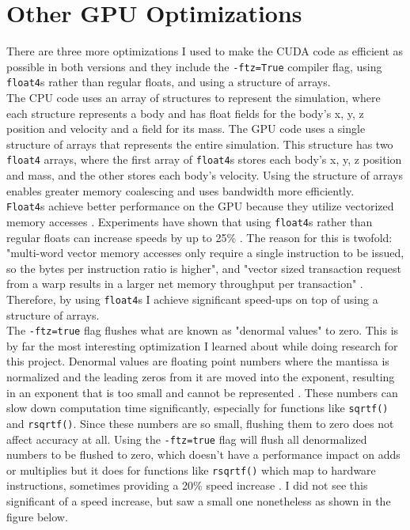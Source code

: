 \section{Other GPU Optimizations}
\indent There are three more optimizations I used to make the CUDA code as efficient as possible in both versions and they include the \verb|-ftz=True| compiler flag, using \verb|float4|s rather than regular floats, and using a structure of arrays. \\
\indent The CPU code uses an array of structures to represent the simulation, where each structure represents a body and has float fields for the body's x, y, z position and velocity and a field for its mass. The GPU code uses a single structure of arrays that represents the entire simulation. This structure has two \verb|float4| arrays, where the first array of \verb|float4|s stores each body's x, y, z position and mass, and the other stores each body's velocity. Using the structure of arrays enables greater memory coalescing and uses bandwidth more efficiently.\\
\indent \verb|Float4|s achieve better performance on the GPU because they utilize vectorized memory accesses \cite{Luitjens_2013}. Experiments have shown that using \verb|float4|s rather than regular floats can increase speeds by up to 25\% \cite{Vitality_2014}. The reason for this is twofold: "multi-word vector memory accesses only require a single instruction to be issued, so the bytes per instruction ratio is higher", and "vector sized transaction request from a warp results in a larger net memory throughput per transaction" \cite{talonmies_2015}. Therefore, by using \verb|float4|s I achieve significant speed-ups on top of using a structure of arrays.\\
\indent The \verb|-ftz=true| flag flushes what are known as "denormal values" to zero. This is by far the most interesting optimization I learned about while doing research for this project. Denormal values are floating point numbers where the mantissa is normalized and the leading zeros from it are moved into the exponent, resulting in an exponent that is too small and cannot be represented \cite{Harris_2013}. These numbers can slow down computation time significantly, especially for functions like \verb|sqrtf()| and \verb|rsqrtf()|. Since these numbers are so small, flushing them to zero does not affect accuracy at all. Using the \verb|-ftz=true| flag will flush all denormalized numbers to be flushed to zero, which doesn't have a performance impact on adds or multiplies but it does for functions like \verb|rsqrtf()| which map to hardware instructions, sometimes providing a 20\% speed increase \cite{Harris_2013}. I did not see this significant of a speed increase, but saw a small one nonetheless as shown in the figure below. 
